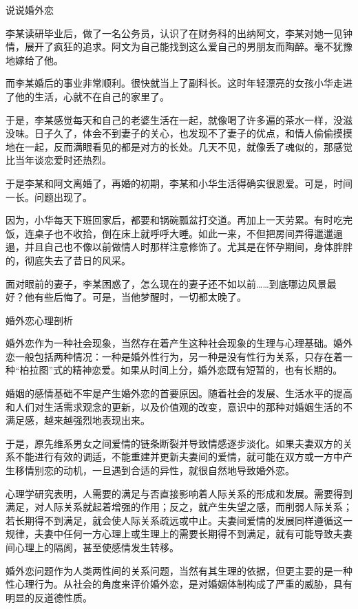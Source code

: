 \documentclass[12pt,UTF8]{ctexbook}
\begin{document}
说说婚外恋


李某读研毕业后，做了一名公务员，认识了在财务科的出纳阿文，李某对她一见钟情，展开了疯狂的追求。阿文为自己能找到这么爱自己的男朋友而陶醉。毫不犹豫地嫁给了他。

而李某婚后的事业非常顺利。很快就当上了副科长。这时年轻漂亮的女孩小华走进了他的生活，心就不在自己的家里了。

于是，李某感觉每天和自己的老婆生活在一起，就像喝了许多遍的茶水一样，没滋没味。日子久了，体会不到妻子的关心，也发现不了妻子的优点，和情人偷偷摸摸地在一起，反而满眼看见的都是对方的长处。几天不见，就像丢了魂似的，那感觉比当年谈恋爱时还热烈。

于是李某和阿文离婚了，再婚的初期，李某和小华生活得确实很恩爱。可是，时间一长。问题出现了。

因为，小华每天下班回家后，都要和锅碗瓢盆打交道。再加上一天劳累。有时吃完饭，连桌子也不收拾，倒在床上就呼呼大睡。如此一来，不但把房间弄得邋邋遢遢，并且自己也不像以前做情人时那样注意修饰了。尤其是在怀孕期间，身体胖胖的，彻底失去了昔日的风采。

面对眼前的妻子，李某困惑了，怎么现在的妻子还不如以前……到底哪边风景最好？他有些后悔了。可是，当他梦醒时，一切都太晚了。





婚外恋心理剖析


婚外恋作为一种社会现象，当然存在着产生这种社会现象的生理与心理基础。婚外恋一般包括两种情况：一种是婚外性行为，另一种是没有性行为关系，只存在着一种“柏拉图”式的精神恋爱。如果从时间上分，婚外恋既有短暂的，也有长期的。

婚姻的感情基础不牢是产生婚外恋的首要原因。随着社会的发展、生活水平的提高和人们对生活需求观念的更新，以及价值观的改变，意识中的那种对婚姻生活的不满足感，越来越强烈地表现出来。

于是，原先维系男女之间爱情的链条断裂并导致情感逐步淡化。如果夫妻双方的关系不能进行有效的调适，不能重建并更新夫妻间的爱情，就可能在双方或一方中产生移情别恋的动机，一旦遇到合适的异性，就很自然地导致婚外恋。

心理学研究表明，人需要的满足与否直接影响着人际关系的形成和发展。需要得到满足，对人际关系就起着增强的作用；反之，就产生失望之感，而削弱人际关系；若长期得不到满足，就会使人际关系疏远或中止。夫妻间爱情的发展同样遵循这一规律，夫妻中任何一方心理上或生理上的需要长期得不到满足，就有可能导致夫妻间心理上的隔阂，甚至使感情发生转移。

婚外恋问题作为人类两性间的关系问题，当然有其生理的依据，但更主要的是一种性心理行为。从社会的角度来评价婚外恋，是对婚姻体制构成了严重的威胁，具有明显的反道德性质。
\end{document}
